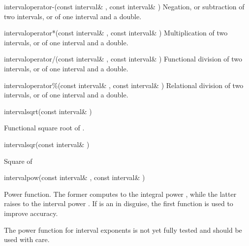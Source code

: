 \documentclass{manual}
\begin{document}
\begin{deffun}{interval}{operator-}{(const interval\& , const interval\& )}
  Negation, or subtraction of two intervals, or of one interval and a double.
\end{deffun}


\begin{deffun}{interval}{operator*}{(const interval\& , const interval\& )}
  Multiplication of two intervals, or of one interval and a double.
\end{deffun}

\begin{deffun}{interval}{operator/}{(const interval\& , const interval\& )}
  Functional division of two intervals, or of one interval and a double.
\end{deffun}

\begin{deffun}{interval}{operator\%}{(const interval\& , const interval\& )}
  Relational division of two intervals, or of one interval and a double.
\end{deffun}

\begin{deffun}{interval}{sqrt}{(const interval\& )}
  \begin{operation}
  \end{operation}
  Functional square root of .
\end{deffun}

\begin{deffun}{interval}{sqr}{(const interval\& )}
  \begin{operation}
  \end{operation}
  Square of 
\end{deffun}

\begin{deffun}{interval}{pow}{(const interval\& , const interval\& )}
  \begin{operation}
  \end{operation}
  Power function. The former computes  to the integral power ,
  while the latter raises  to the interval power . If
   is an  in disguise, the first function is used to
  improve accuracy.

  The power function for interval exponents is not yet fully tested and should be used with care.
\end{deffun}
\end{document}
